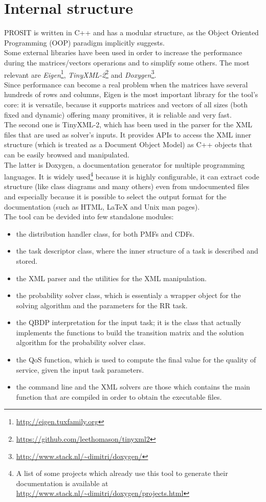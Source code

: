 \section{Internal structure}\label{structure}
PROSIT is written in C++ and has a modular structure, as the Object Oriented Programming (OOP) paradigm implicitly suggests.\\
Some external libraries have been used in order to increase the performance during the matrices/vectors operarions and to simplify some others. The most relevant are \emph{Eigen}\footnote{\url{http://eigen.tuxfamily.org}}, \emph{TinyXML-2}\footnote{\url{https://github.com/leethomason/tinyxml2}} and \emph{Doxygen}\footnote{\url{http://www.stack.nl/~dimitri/doxygen/}}.\\   
Since performance can become a real problem when the matrices have several hundreds of rows and columns, Eigen is the most important library for the tool's core: it is versatile, because it supports matrices and vectors of all sizes (both fixed and dynamic) offering many promitives, it is reliable and very fast.\\
The second one is TinyXML-2, which has been used in the parser for the XML files that are used as solver's inputs. It provides APIs to access the XML inner structure (which is treated as a Document Object Model) as C++ objects that can be easily browsed and manipulated.\\
The latter is Doxygen, a documentation generator for multiple programming languages. It is widely used\footnote{A list of some projects which already use this tool to generate their documentation is available at \url{http://www.stack.nl/~dimitri/doxygen/projects.html}} because it is highly configurable, it can extract code structure (like class diagrams and many others) even from undocumented files and especially because it is possible to select the output format for the documentation (such as HTML, {\LaTeX} and Unix man pages).\\
The tool can be devided into few standalone modules:
\begin{itemize}
  \item the distribution handler class, for both PMFs and CDFs.
  \item the task descriptor class, where the inner structure of a task is described and stored.
  \item the XML parser and the utilities for the XML manipulation.
  \item the probability solver class, which is essentialy a wrapper object for the solving algorithm and the parameters for the RR task.
  \item the QBDP interpretation for the input task; it is the class that actually implements the functions to build the transition matrix and the solution algorithm for the probability solver class.
  \item the QoS function, which is used to compute the final value for the quality of service, given the input task parameters.
  \item the command line and the XML solvers are those which contains the main function that are compiled in order to obtain the executable files.
\end{itemize}

